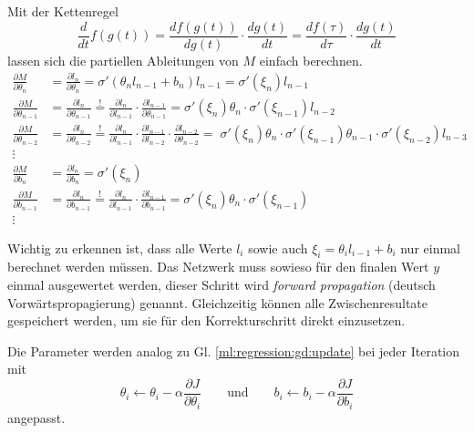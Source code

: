 Mit der Kettenregel
\begin{equation}
    \frac{d}{dt}f(g(t)) = \frac{df(g(t))}{d g(t)} \cdot \frac{d g(t)}{dt} = \frac{df(\tau)}{d \tau} \cdot \frac{d g(t)}{dt}
\end{equation}
lassen sich die partiellen Ableitungen von $M$ einfach berechnen.
\[
\begin{aligned}
    \frac{\partial M}{\partial \theta_n} &= \frac{\partial l_n}{\partial \theta_n} =
    \sigma'(\theta_n l_{n-1} + b_n) l_{n-1} = \sigma'(\xi_n)l_{n-1} \\
    \frac{\partial M}{\partial \theta_{n-1}} &= \frac{\partial l_{n}}{\partial \theta_{n-1}}
    \stackrel{!}{=} \frac{\partial l_n}{\partial l_{n-1}} \cdot \frac{\partial
    l_{n-1}}{\partial \theta_{n-1}} = 
    \sigma'(\xi_n) \theta_n \cdot \sigma'(\xi_{n-1}) l_{n-2}
    \\
    \frac{\partial M}{\partial \theta_{n-2}} &= \frac{\partial l_{n}}{\partial \theta_{n-2}}
    \stackrel{!}{=} \frac{\partial l_n}{\partial l_{n-1}} \cdot \frac{\partial
    l_{n-1}}{\partial l_{n-2}}\cdot \frac{\partial l_{n-2}}{\partial \theta_{n-2}} =
    \; \sigma'(\xi_n)\theta_n \cdot \sigma'(\xi_{n-1})\theta_{n-1}\cdot \sigma'(\xi_{n-2})l_{n-3}
    \\
    \vdots\quad&\\
    \frac{\partial M}{\partial b_n} &= \frac{\partial l_n}{\partial b_n} =
    \sigma'(\xi_n) \\
    \frac{\partial M}{\partial b_{n-1}} &= \frac{\partial l_{n}}{\partial b_{n-1}}
    \stackrel{!}{=} \frac{\partial l_n}{\partial l_{n-1}} \cdot \frac{\partial
    l_{n-1}}{\partial b_{n-1}} = 
    \sigma'(\xi_n) \theta_n \cdot \sigma'(\xi_{n-1}) \\
    \vdots\quad&
\end{aligned}
\]

Wichtig zu erkennen ist, dass alle Werte $l_i$ sowie auch $\xi_i=\theta_i l_{i-1}+b_i$ nur
einmal berechnet werden müssen. Das Netzwerk muss sowieso für den finalen Wert $y$ einmal
ausgewertet werden, dieser Schritt wird \emph{forward propagation} (deutsch Vorwärtspropagierung)
genannt. Gleichzeitig können alle Zwischenresultate gespeichert werden, um sie für den
Korrekturschritt direkt einzusetzen.

Die Parameter werden analog zu Gl. \ref{ml:regression:gd:update} bei jeder Iteration mit
\begin{equation}
    \theta_i \leftarrow \theta_i - \alpha \frac{\partial J}{\partial \theta_i}
    \qquad\text{und}\qquad
    b_i \leftarrow b_i - \alpha \frac{\partial J}{\partial b_i}
\end{equation}
angepasst.

